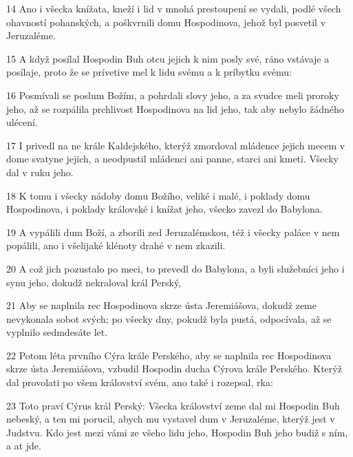 \par 14 Ano i všecka knížata, kneží i lid v mnohá prestoupení se vydali, podlé všech ohavností pohanských, a poškvrnili domu Hospodinova, jehož byl posvetil v Jeruzaléme.
\par 15 A když posílal Hospodin Buh otcu jejich k nim posly své, ráno vstávaje a posílaje, proto že se prívetive mel k lidu svému a k príbytku svému:
\par 16 Posmívali se poslum Božím, a pohrdali slovy jeho, a za svudce meli proroky jeho, až se rozpálila prchlivost Hospodinova na lid jeho, tak aby nebylo žádného ulécení.
\par 17 I privedl na ne krále Kaldejského, kterýž zmordoval mládence jejich mecem v dome svatyne jejich, a neodpustil mládenci ani panne, starci ani kmeti. Všecky dal v ruku jeho.
\par 18 K tomu i všecky nádoby domu Božího, veliké i malé, i poklady domu Hospodinova, i poklady královské i knížat jeho, všecko zavezl do Babylona.
\par 19 A vypálili dum Boží, a zborili zed Jeruzalémskou, též i všecky paláce v nem popálili, ano i všelijaké klénoty drahé v nem zkazili.
\par 20 A což jich pozustalo po meci, to prevedl do Babylona, a byli služebníci jeho i synu jeho, dokudž nekraloval král Perský,
\par 21 Aby se naplnila rec Hospodinova skrze ústa Jeremiášova, dokudž zeme nevykonala sobot svých; po všecky dny, pokudž byla pustá, odpocívala, až se vyplnilo sedmdesáte let.
\par 22 Potom léta prvního Cýra krále Perského, aby se naplnila rec Hospodinova skrze ústa Jeremiášova, vzbudil Hospodin ducha Cýrova krále Perského. Kterýž dal provolati po všem království svém, ano také i rozepsal, rka:
\par 23 Toto praví Cýrus král Perský: Všecka království zeme dal mi Hospodin Buh nebeský, a ten mi porucil, abych mu vystavel dum v Jeruzaléme, kterýž jest v Judstvu. Kdo jest mezi vámi ze všeho lidu jeho, Hospodin Buh jeho budiž s ním, a at jde.

